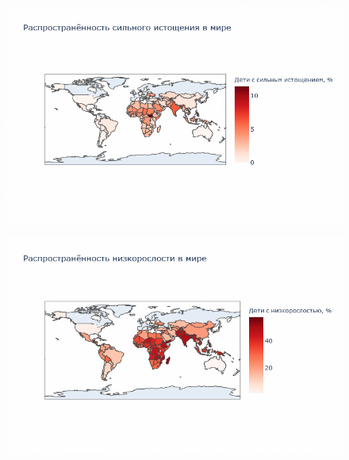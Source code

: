 \documentclass{beamer}
\begin{document}
\begin{frame}

\begin{figure}
	\centering
	\includegraphics[width=125mm]{12.png}
\end{figure}


\end{frame}


\begin{frame}

\begin{figure}
	\centering
	\includegraphics[width=125mm]{13.png}
\end{figure}


\end{frame}
\end{document}
